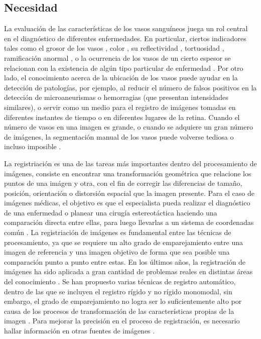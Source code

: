\subsection{Necesidad}
La evaluaci\'on de las caracter\'isticas de los vasos sangu\'ineos  juega un  rol central en el diagn\'ostico de diferentes enfermedades. En particular, ciertos indicadores tales como el grosor de los vasos \cite{wong2004prospective} \cite{hubbard1999methods} \cite{niemeijer2010automatic}, color \cite{chaudhuri1989detection}, su reflectividad \cite{beach1999oximetry}, tortuosidad \cite{hart1999measurement} \cite{heneghan2002characterization} \cite{capowski1995numeric}, ramificaci\'on anormal \cite{chutatape1998retinal}, o la ocurrencia de los vasos de un cierto espesor  se relacionan con la existencia de algún tipo particular de enfermedad \cite{sinthanayothin1999automated} \cite{martinez2007segmentation}.
Por otro lado, el conocimiento acerca de la ubicación de los vasos puede ayudar en la detección de patologías, por ejemplo, al reducir el número de falsos positivos en la detección de microaneurismas o hemorragias (que presentan intensidades similares), o servir como un medio para el registro de imágenes tomadas en diferentes instantes de tiempo o en diferentes lugares de la retina.\cite{staal2004ridge} Cuando el n\'umero de vasos en una imagen es grande, o cuando se adquiere un gran n\'umero de im\'agenes, la segmentaci\'on manual de los vasos puede volverse tediosa o incluso imposible \cite{jimenez2012automated}.

La registriaci\'on es una de las tareas m\'as importantes dentro del procesamiento de im\'agenes, consiste en encontrar una transformaci\'on geom\'etrica que relacione los puntos de una im\'agen y otra, con el fin de corregir las diferencias de tamaño, posici\'on, orientaci\'on o distorsi\'on espacial que la imagen presente. Para el caso de im\'agenes m\'edicas, el objetivo es que el especialista pueda realizar el diagn\'ostico de una enfermedad o planear una cirug\'ia estereot\'actica haciendo una comparaci\'on directa entre ellas, para luego llevarlas a un sistema de coordenadas com\'un \cite{velez2014metodologia}.
La registriaci\'on de im\'agenes es fundamental entre las t\'ecnicas de procesamiento, ya que se requiere un alto grado de emparejamiento entre una imagen de referencia y una imagen objetivo de forma que sea posible una comparaci\'on punto a punto entre estas. En los \'ultimos años, la registraci\'on de im\'agenes ha sido aplicada a gran cantidad de problemas reales en distintas \'areas del conocimiento \cite{zitova2003image} \cite{pluim2003image}. Se han propuesto varias t\'ecnicas de registro autom\'atico, dentro de las que se incluyen el registro r\'igido y no r\'igido monomodal, sin embargo, el grado de emparejamiento no logra ser lo suficientemente alto por causa de los procesos de transformaci\'on de las caracter\'isticas propias de la imagen \cite{hill2001medical} \cite{rueckert2010nonrigid}. Para mejorar la precisi\'on en el proceso de registraci\'on, es necesario hallar informaci\'on en otras fuentes de im\'agenes \cite{velez2014metodologia}.


